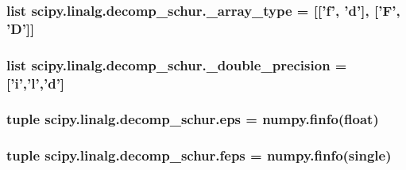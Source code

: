 \subsubsection[{\+\_\+array\+\_\+type}]{\setlength{\rightskip}{0pt plus 5cm}list scipy.\+linalg.\+decomp\+\_\+schur.\+\_\+array\+\_\+type = \mbox{[}\mbox{[}'f', 'd'\mbox{]}, \mbox{[}'F', '{\bf D}'\mbox{]}\mbox{]}}\label{namespacescipy_1_1linalg_1_1decomp__schur_a1150815720cb4787dc838ec5c857d0cb}
\hypertarget{namespacescipy_1_1linalg_1_1decomp__schur_ad2f19b0afbd9ac7726320e84f767c528}{}
\subsubsection[{\+\_\+double\+\_\+precision}]{\setlength{\rightskip}{0pt plus 5cm}list scipy.\+linalg.\+decomp\+\_\+schur.\+\_\+double\+\_\+precision = \mbox{[}'{\bf i}','{\bf l}','d'\mbox{]}}\label{namespacescipy_1_1linalg_1_1decomp__schur_ad2f19b0afbd9ac7726320e84f767c528}
\hypertarget{namespacescipy_1_1linalg_1_1decomp__schur_a1dad44a280fa110f881719af6845e93a}{}
\subsubsection[{eps}]{\setlength{\rightskip}{0pt plus 5cm}tuple scipy.\+linalg.\+decomp\+\_\+schur.\+eps = numpy.\+finfo(float)}\label{namespacescipy_1_1linalg_1_1decomp__schur_a1dad44a280fa110f881719af6845e93a}
\hypertarget{namespacescipy_1_1linalg_1_1decomp__schur_a270f819ccd3f1c74e6fbabfab2677a8c}{}
\subsubsection[{feps}]{\setlength{\rightskip}{0pt plus 5cm}tuple scipy.\+linalg.\+decomp\+\_\+schur.\+feps = numpy.\+finfo(single)}\label{namespacescipy_1_1linalg_1_1decomp__schur_a270f819ccd3f1c74e6fbabfab2677a8c}
